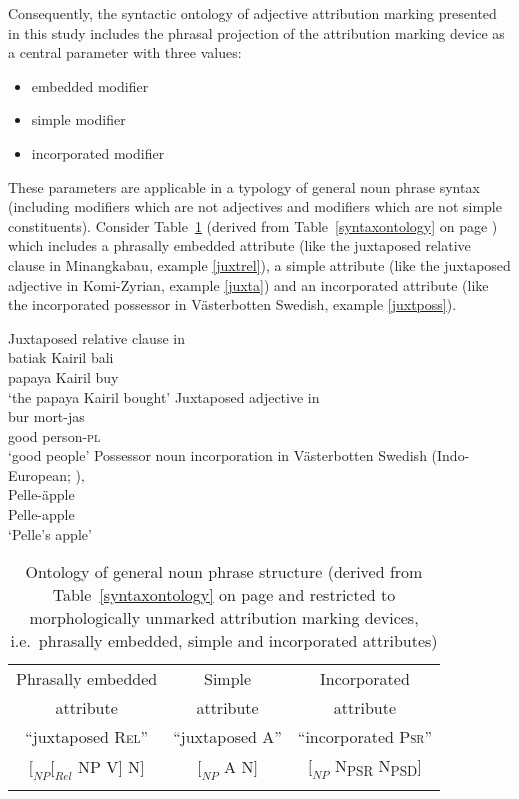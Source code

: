 Consequently, the syntactic ontology of adjective attribution marking presented in this study includes the phrasal projection of the attribution marking device as a central parameter with three values:
\begin{itemize}
\item embedded modifier
\item simple modifier
\item incorporated modifier
\end{itemize}
These parameters are applicable in a typology of general noun phrase syntax (including modifiers which are not adjectives and modifiers which are not simple constituents). Consider Table~\ref{ontologyderived} (derived from Table~\ref{syntaxontology} on page \pageref{syntaxontology}) which includes a phrasally embedded attribute (like the juxtaposed relative clause in Minangkabau, example \ref{juxtrel}), a simple attribute (like the juxtaposed adjective in Komi-Zyrian, example \ref{juxta}) and an incorporated attribute (like the incorporated possessor in Västerbotten Swedish, example \ref{juxtposs}).
\begin{exe}
\ex
\begin{xlist}
\ex \label{juxtrel}
\rm{Juxtaposed relative clause in }\\
\gll batiak Kairil bali\\
	papaya Kairil buy\\
\glt	‘the papaya Kairil bought’
\ex \label{juxta}
\rm{Juxtaposed adjective in }\\
\gll		bur	mort-jas\\
		good	person-\textsc{pl}\\
\glt		‘good people’
\ex \label{juxtposs}
\rm{Possessor noun incorporation in Västerbotten Swedish (Indo-European; \citealt[3–4]{gil2005})}‚\\
\gll	Pelle-äpple\\
	Pelle-apple\\
\glt	‘Pelle's apple’
\end{xlist}
\end{exe}
\begin{table}
\begin{tabular}{c c c}
\lsptoprule
Phrasally embedded			&Simple					&Incorporated\\
attribute					&attribute					&attribute\\
\midrule
“juxtaposed \textsc{Rel}”		&“juxtaposed \textsc{A}”		&“incorporated \textsc{Psr}”\\
\midrule
$[_{NP} [_{Rel}$ NP V$]$ N$]$	&$[_{NP}$ A N$]$			&$[_{NP}$ N\textsubscript{PSR} N\textsubscript{PSD}$]$\\
\lspbottomrule
\end{tabular}
\caption[Ontology of general noun phrase structure]{Ontology of general noun phrase structure (derived from Table~\ref{syntaxontology} on page \pageref{syntaxontology} and restricted to morphologically unmarked attribution marking devices, i.e.~phrasally embedded, simple and incorporated attributes)}\label{ontologyderived}
\end{table}
